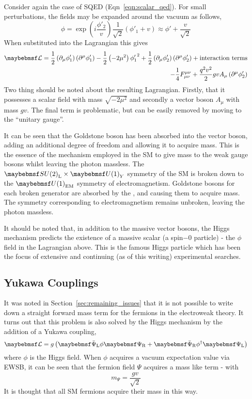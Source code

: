 Consider again the case of \ac{SQED} (Eqn~\ref{eqn:scalar_qed}). For small
perturbations, the fields may be expanded around the vacuum as follows,
\begin{equation}
\phi = \exp\left(i\frac{\phi'_2}{v}\right)\frac{1}{\sqrt{2}}\left(\phi'_1 + v\right) \approx
\phi' + \frac{v}{\sqrt{2}}
\end{equation}
When substituted into the Lagrangian this gives
\begin{align*}
  \lagrangiand =
  \frac{1}{2}\left(\partial_{\mu}\phi'_1\right)\left(\partial^{\mu}\phi'_1\right)
  - \frac{1}{2}\left(-2\mu^2\right){\phi'_1}^2 +
  \frac{1}{2}\left(\partial_{\mu}\phi'_2\right)\left(\partial^{\mu}\phi'_2\right)
  + \textrm{interaction terms}\\
  - \frac{1}{4}F_{\mu\nu}^{\mu\nu} +
  \frac{q^2v^2}{2}gvA_{\mu}\left(\partial^{\mu}\phi'_2\right)
\end{align*}
Two thing should be noted about the resulting Lagrangian. Firstly, that it
possesses a scalar field with mass $\sqrt{-2\mu^2}$ and secondly a vector
boson $A_{\mu}$ with mass $gv$. The final term is problematic, but can be
easily removed by moving to the ``unitary gauge''.

It can be seen that the Goldstone boson has been absorbed into the vector boson,
adding an additional degree of freedom and allowing it to acquire mass. This is
the essence of the mechanism employed in the \ac{SM} to give mass to the weak
gauge bosons whilst leaving the photon massless. The
$\SUtwo_{\textrm{L}}\times\Uone_{Y}$ symmetry of the \ac{SM} is broken down to
the $\Uone_{\textrm{EM}}$ symmetry of electromagnetism. Goldstone bosons for
each broken generator are absorbed by the \PWp, \PWm and \PZ causing them to
acquire mass. The symmetry corresponding to electromagnetism remains unbroken,
leaving the photon massless.

It should be noted that, in addition to the massive vector bosons, the Higgs
mechanism predicts the existence of a massive scalar (a spin$-0$ particle) - the
$\phi$ field in the Lagrangian above. This is the famous Higgs particle which
has been the focus of extensive and continuing (as of this writing) experimental
searches.

\subsection{Yukawa Couplings}
\label{sec:theory_yukawa}
It was noted in Section~\ref{sec:remaining_issues} that it is not possible to
write down a straight forward mass term for the fermions in the electroweak
theory. It turns out that this problem is also solved by the Higgs mechanism by
the addition of a Yukawa coupling,
\begin{equation}
\lagrangiand = g \left(\APsiL \phi \PsiR + \APsiR\phi^{\dagger}\PsiL\right)
\end{equation}
where $\phi$ is the Higgs field. When $\phi$ acquires a vacuum expectation value
via \ac{EWSB}, it can be seen that the fermion field $\Psi$ acquires a mass like
term - with
\begin{equation}
m_{\Psi} = \frac{gv}{\sqrt{2}}
\end{equation}
It is thought that all \ac{SM} fermions acquire their mass in this way.

